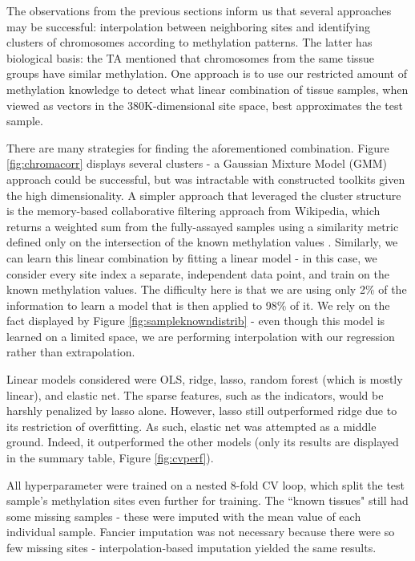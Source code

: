 \documentclass{article} %
\begin{document}
The observations from the previous sections inform us that several approaches may be successful: interpolation between neighboring sites and identifying clusters of chromosomes according to methylation patterns. The latter has biological basis: the TA mentioned that chromosomes from the same tissue groups have similar methylation. One approach is to use our restricted amount of methylation knowledge to detect what linear combination of tissue samples, when viewed as vectors in the 380K-dimensional site space, best approximates the test sample.

There are many strategies for finding the aforementioned combination. Figure \ref{fig:chromacorr} displays several clusters - a Gaussian Mixture Model (GMM) approach could be successful, but was intractable with constructed toolkits given the high dimensionality. A simpler approach that leveraged the cluster structure is the memory-based collaborative filtering approach from Wikipedia, which returns a weighted sum from the fully-assayed samples using a similarity metric defined only on the intersection of the known methylation values \cite{wiki:cf}. Similarly, we can learn this linear combination by fitting a linear model - in this case, we consider every site index a separate, independent data point, and train on the known methylation values. The difficulty here is that we are using only 2\% of the information to learn a model that is then applied to 98\% of it. We rely on the fact displayed by Figure \ref{fig:sampleknowndistrib} - even though this model is learned on a limited space, we are performing interpolation with our regression rather than extrapolation.

Linear models considered were OLS, ridge, lasso, random forest (which is mostly linear), and elastic net. The sparse features, such as the indicators, would be harshly penalized by lasso alone. However, lasso still outperformed ridge due to its restriction of overfitting. As such, elastic net was attempted as a middle ground. Indeed, it outperformed the other models (only its results are displayed in the summary table, Figure \ref{fig:cvperf}).

All hyperparameter were trained on a nested 8-fold CV loop, which split the test sample's methylation sites even further for training. The ``known tissues" still had some missing samples - these were imputed with the mean value of each individual sample. Fancier imputation was not necessary because there were so few missing sites - interpolation-based imputation yielded the same results.
\end{document}
